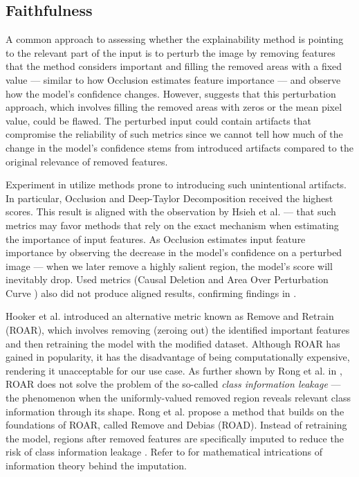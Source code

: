 \subsection*{Faithfulness}

A common approach to assessing whether the explainability method is pointing to the relevant part of the input is to perturb the image by removing features that the method considers important and filling the removed areas with a fixed value  --- similar to how Occlusion estimates feature importance --- and observe how the model's confidence changes.
However, \cite{roar} suggests that this perturbation approach, which involves filling the removed areas with zeros or the mean pixel value, could be flawed.
The perturbed input could contain artifacts that compromise the reliability of such metrics since we cannot tell how much of the change in the model's confidence stems from introduced artifacts compared to the original relevance of removed features.

Experiment in \cite{gallo} utilize methods prone to introducing such unintentional artifacts.
In particular, Occlusion and Deep-Taylor Decomposition \cite{xai-dtd} received the highest scores.
This result is aligned with the observation by Hsieh et al. \cite{xai-hsieh-occ-dtd} --- that such metrics may favor methods that rely on the exact mechanism when estimating the importance of input features.
As Occlusion estimates input feature importance by observing the decrease in the model's confidence on a perturbed image --- when we later remove a highly salient region, the model's score will inevitably drop.
Used metrics (Causal Deletion \cite{xai-causal-deletion} and Area Over Perturbation Curve \cite{xai-aopc}) also did not produce aligned results, confirming findings in \cite{roar}.

Hooker et al. \cite{roar} introduced an alternative metric known as Remove and Retrain (ROAR), which involves removing (zeroing out) the identified important features and then retraining the model with the modified dataset.
Although ROAR has gained in popularity, it has the disadvantage of being computationally expensive, rendering it unacceptable for our use case.
As further shown by Rong et al. in \cite{road}, ROAR does not solve the problem of the so-called \emph{class information leakage} --- the phenomenon when the uniformly-valued removed region reveals relevant class information through its shape.
Rong et al. propose a method that builds on the foundations of ROAR, called Remove and Debias (ROAD).
Instead of retraining the model, regions after removed features are specifically imputed to reduce the risk of class information leakage \cite{road}.
Refer to \cite{road} for mathematical intrications of information theory behind the imputation.

